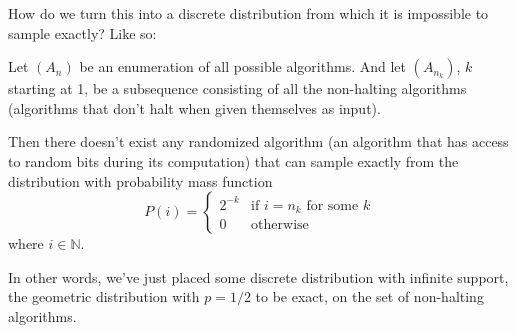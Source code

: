 How do we turn this into a discrete distribution from which it is impossible to sample exactly? Like so:

\begin{proposition}
	Let $(A_n)$ be an enumeration of all possible algorithms. And let $(A_{n_k})$, $k$ starting at 1, be a subsequence consisting of all the non-halting algorithms (algorithms that don't halt when given themselves as input).
	
	Then there doesn't exist any randomized algorithm (an algorithm that has access to random bits during its computation) that can sample exactly from the distribution with probability mass function 
	\[
	P(i) = 
	\begin{cases}
	2^{-k} & \text{if $i=n_k$ for some $k$}\\
	0 & \text{otherwise}
	\end{cases}
	\]
	where $i\in\mathbb{N}$.
\end{proposition}
In other words, we've just placed some discrete distribution with infinite support, the geometric distribution with $p = 1/2$ to be exact, on the set of non-halting algorithms. 
